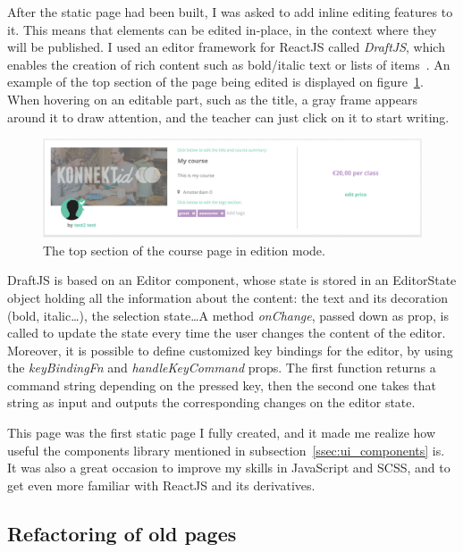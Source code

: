 After the static page had been built, I was asked to add inline editing features to it.
This means that elements can be edited in-place, in the context where they will be published. I used an editor framework for ReactJS called \textit{DraftJS}, which enables the creation of rich content such as bold/italic text or lists of items~\cite{draftJS}. An example of the top section of the page being edited is displayed on {\sc figure}~\ref{fig:courseEditIntro}. When hovering on an editable part, such as the title, a gray frame appears around it to draw attention, and the teacher can just click on it to start writing.

\begin{figure}[H]
    \centering
    \includegraphics[scale=0.2]{figure/courseEditIntro.png}
    \caption{The top section of the course page in edition mode.}
    \label{fig:courseEditIntro}
\end{figure}

DraftJS is based on an \guillemotleft{} Editor \guillemotright{} component, whose state is stored in an \guillemotleft{} EditorState \guillemotright{} object holding all the information about the content: the text and its decoration (bold, italic\ldots), the selection state\ldots A method \textit{onChange}, passed down as prop, is called to update the state every time the user changes the content of the editor. Moreover, it is possible to define customized key bindings for the editor, by using the \textit{keyBindingFn} and \textit{handleKeyCommand} props. The first function returns a command string depending on the pressed key, then the second one takes that string as input and outputs the corresponding changes on the editor state.

This page was the first static page I fully created, and it made me realize how useful the components library mentioned in {\sc subsection}~\ref{ssec:ui_components} is. It was also a great occasion to improve my skills in JavaScript and SCSS, and to get even more familiar with ReactJS and its derivatives.

\subsection{Refactoring of old pages}
\label{ssec:refactor}

